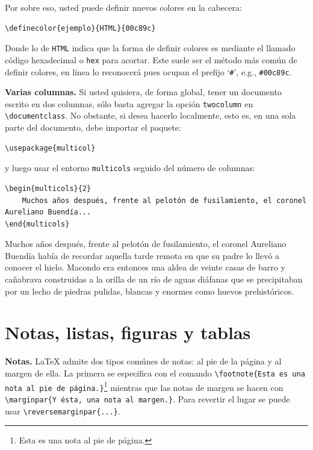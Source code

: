 Por sobre eso, usted puede definir nuevos colores en la cabecera:
\begin{lstlisting}
\definecolor{ejemplo}{HTML}{00c89c}
\end{lstlisting}
Donde lo de \texttt{HTML} indica que la forma de definir colores es mediante el llamado código hexadecimal o \texttt{hex} para acortar. Este suele ser el método más común de definir colores, en línea lo reconocerá pues ocupan el prefijo `\texttt{\#}', e.g., \texttt{\color{sample}\#00c89c}.

\textbf{Varias columnas.} Si usted quisiera, de forma global, tener un documento escrito en dos columnas, sólo basta agregar la opción \texttt{twocolumn} en \lstinline|\documentclass|. No obstante, si desea hacerlo localmente, esto es, en una sola parte del documento, debe importar el paquete:
\begin{lstlisting}
\usepackage{multicol}
\end{lstlisting}
y luego usar el entorno \texttt{multicols} seguido del número de columnas:
\begin{lstlisting}
\begin{multicols}{2}
	Muchos años después, frente al pelotón de fusilamiento, el coronel Aureliano Buendía...
\end{multicols}
\end{lstlisting}
\begin{multicols}{2}
	Muchos años después, frente al pelotón de fusilamiento, el coronel Aureliano Buendía había de recordar aquella tarde remota en que su padre lo llevó a conocer el hielo. Macondo era entonces una aldea de veinte casas de barro y cañabrava construidas a la orilla de un río de aguas diáfanas que se precipitaban por un lecho de piedras pulidas, blancas y enormes como huevos prehistóricos.
\end{multicols}

\section{Notas, listas, figuras y tablas}
\textbf{Notas.} \LaTeX{} admite dos tipos comúnes de notas: al pie de la página y al margen de ella. La primera se especifica con el comando \lstinline|\footnote{Esta es una nota al pie de página.}|\footnote{Esta es una nota al pie de página.} mientras que las notas de margen se hacen con \lstinline|\marginpar{Y ésta, una nota al margen.}|. Para revertir el lugar se puede usar \lstinline|\reversemarginpar{...}|.

